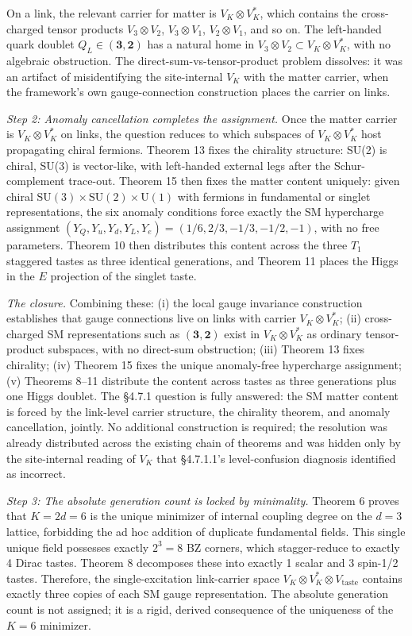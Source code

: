 \documentclass[
]{article}
\begin{document}
On a link, the relevant carrier for matter is \(V_K \otimes V_K^*\),
which contains the cross-charged tensor products \(V_3 \otimes V_2\),
\(V_3 \otimes V_1\), \(V_2 \otimes V_1\), and so on. The left-handed
quark doublet \(Q_L \in (\mathbf{3}, \mathbf{2})\) has a natural home in
\(V_3 \otimes V_2 \subset V_K \otimes V_K^*\), with no algebraic
obstruction. The direct-sum-vs-tensor-product problem dissolves: it was
an artifact of misidentifying the site-internal \(V_K\) with the matter
carrier, when the framework's own gauge-connection construction places
the carrier on links.

\emph{Step 2: Anomaly cancellation completes the assignment.} Once the
matter carrier is \(V_K \otimes V_K^*\) on links, the question reduces
to which subspaces of \(V_K \otimes V_K^*\) host propagating chiral
fermions. Theorem 13 fixes the chirality structure: SU(2) is chiral,
SU(3) is vector-like, with left-handed external legs after the
Schur-complement trace-out. Theorem 15 then fixes the matter content
uniquely: given chiral
\(\mathrm{SU}(3) \times \mathrm{SU}(2) \times \mathrm{U}(1)\) with
fermions in fundamental or singlet representations, the six anomaly
conditions force exactly the SM hypercharge assignment
\((Y_Q, Y_u, Y_d, Y_L, Y_e) = (1/6, 2/3, -1/3, -1/2, -1)\), with no free
parameters. Theorem 10 then distributes this content across the three
\(T_1\) staggered tastes as three identical generations, and Theorem 11
places the Higgs in the \(E\) projection of the singlet taste.

\emph{The closure.} Combining these: (i) the local gauge invariance
construction establishes that gauge connections live on links with
carrier \(V_K \otimes V_K^*\); (ii) cross-charged SM representations
such as \((\mathbf{3}, \mathbf{2})\) exist in \(V_K \otimes V_K^*\) as
ordinary tensor-product subspaces, with no direct-sum obstruction; (iii)
Theorem 13 fixes chirality; (iv) Theorem 15 fixes the unique
anomaly-free hypercharge assignment; (v) Theorems 8--11 distribute the
content across tastes as three generations plus one Higgs doublet. The
§4.7.1 question is fully answered: the SM matter content is forced by
the link-level carrier structure, the chirality theorem, and anomaly
cancellation, jointly. No additional construction is required; the
resolution was already distributed across the existing chain of theorems
and was hidden only by the site-internal reading of \(V_K\) that
§4.7.1.1's level-confusion diagnosis identified as incorrect.

\emph{Step 3: The absolute generation count is locked by minimality.}
Theorem 6 proves that \(K = 2d = 6\) is the unique minimizer of internal
coupling degree on the \(d = 3\) lattice, forbidding the ad hoc addition
of duplicate fundamental fields. This single unique field possesses
exactly \(2^3 = 8\) BZ corners, which stagger-reduce to exactly 4 Dirac
tastes. Theorem 8 decomposes these into exactly 1 scalar and 3 spin-1/2
tastes. Therefore, the single-excitation link-carrier space
\(V_K \otimes V_K^* \otimes V_{\text{taste}}\) contains exactly three
copies of each SM gauge representation. The absolute generation count is
not assigned; it is a rigid, derived consequence of the uniqueness of
the \(K = 6\) minimizer.
\end{document}
